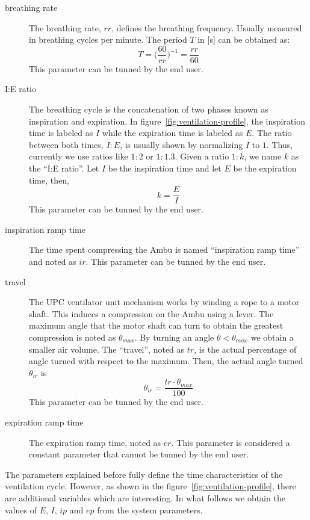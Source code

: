 \documentclass[a4paper]{article}
\begin{document}
\begin{description}
  
\item[breathing rate] The breathing rate, $\mathit{rr}$, defines the
  breathing frequency. Usually measured in breathing cycles per
  minute. The period $T$ in [\si{\second}] can be obtained as:
  $$
  \boxed{
    T = \bigg(\frac{60}{\mathit{rr}}\bigg)^{-1} = \frac{\mathit{rr}}{60}
  }
  $$
  This parameter can be tunned by the end user.

\item[I:E ratio] The breathing cycle is the concatenation of two
  phases known as inspiration and expiration. In
  figure~\ref{fig:ventilation-profile}, the inspiration time is
  labeled as $I$ while the expiration time is labeled as $E$. The
  ratio between both times, $I:E$, is usually shown by normalizing $I$
  to $1$. Thus, currently we use ratios like $1:2$ or $1:1.3$. Given a
  ratio $1:k$, we name $k$ as the ``I:E ratio''. Let $I$ be the
  inspiration time and let $E$ be the expiration time, then,
  $$
  k=\frac{E}{I}
  $$
  This parameter can be tunned by the end user.
  
\item[inspiration ramp time] The time spent compressing the Ambu is
  named ``inspiration ramp time'' and noted as $\mathit{ir}$.
  This parameter can be tunned by the end user.
  
\item[travel] The UPC ventilator unit mechanism works by winding a
  rope to a motor shaft. This induces a compression on the Ambu using
  a lever. The maximum angle that the motor shaft can turn to obtain
  the greatest compression is noted as $\theta_\textit{max}$. By
  turning an angle $\theta<\theta_\textit{max}$ we obtain a smaller
  air volume. The ``travel'', noted as $\mathit{tr}$, is the actual
  percentage of angle turned with respect to the maximum. Then, the
  actual angle turned $\theta_{ir}$ is
  $$
  \boxed{
    \theta_{ir} = \frac{\mathit{tr}\cdot\theta_\mathit{max}}{100}
  }
  $$
  This parameter can be tunned by the end user.
  
\item[expiration ramp time] The expiration ramp time, noted as
  $\mathit{er}$. This parameter is considered a constant parameter
  that cannot be tunned by the end user.

\end{description}


The parameters explained before fully define the time characteristics
of the ventilation cycle. However, as shown in the
figure~\ref{fig:ventilation-profile}, there are additional variables
which are interesting. In what follows we obtain the values of $E$,
$I$, $\mathit{ip}$ and $\mathit{ep}$ from the system parameters.
\end{document}
